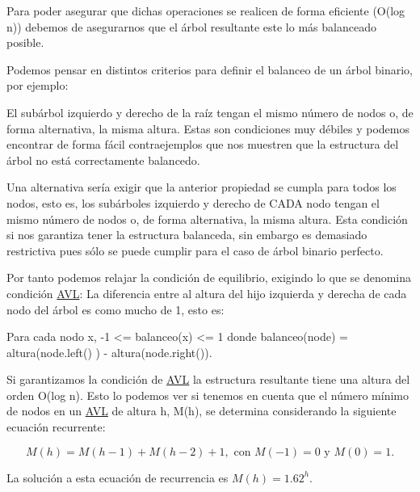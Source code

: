 Para poder asegurar que dichas operaciones se realicen de forma eficiente (O(log n)) debemos de asegurarnos que el árbol resultante este lo más balanceado posible.

Podemos pensar en distintos criterios para definir el balanceo de un árbol binario, por ejemplo\-:

\begin{DoxyItemize}
\item El subárbol izquierdo y derecho de la raíz tengan el mismo número de nodos o, de forma alternativa, la misma altura. Estas son condiciones muy débiles y podemos encontrar de forma fácil contraejemplos que nos muestren que la estructura del árbol no está correctamente balancedo.\end{DoxyItemize}
\begin{DoxyItemize}
\item Una alternativa sería exigir que la anterior propiedad se cumpla para todos los nodos, esto es, los subárboles izquierdo y derecho de C\-A\-D\-A nodo tengan el mismo número de nodos o, de forma alternativa, la misma altura. Esta condición si nos garantiza tener la estructura balanceda, sin embargo es demasiado restrictiva pues sólo se puede cumplir para el caso de árbol binario perfecto.\end{DoxyItemize}
\begin{DoxyItemize}
\item Por tanto podemos relajar la condición de equilibrio, exigindo lo que se denomina condición \hyperlink{classAVL}{A\-V\-L}\-: La diferencia entre al altura del hijo izquierda y derecha de cada nodo del árbol es como mucho de 1, esto es\-:\end{DoxyItemize}

\begin{DoxyCode}
Para cada nodo x,  -1 <=  balanceo(x)   <= 1
donde  balanceo(node) = altura(node.left() ) - altura(node.right()).
\end{DoxyCode}


Si garantizamos la condición de \hyperlink{classAVL}{A\-V\-L} la estructura resultante tiene una altura del orden O(log n). Esto lo podemos ver si tenemos en cuenta que el número mínimo de nodos en un \hyperlink{classAVL}{A\-V\-L} de altura h, M(h), se determina considerando la siguiente ecuación recurrente\-:

\[ M(h) = M(h-1)+M(h-2) +1, \mbox{ con } M(-1) = 0 \mbox{ y } M(0) = 1. \]

La solución a esta ecuación de recurrencia es $M(h) = 1.62^h$.

